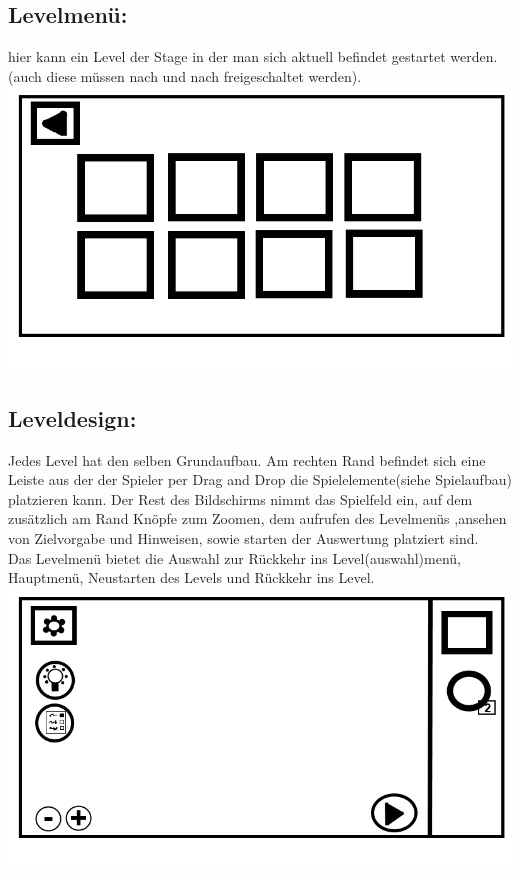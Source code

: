 \documentclass{scrartcl}
\begin{document}
\begin{enumerate}
	\begin{minipage}{1\textwidth}
		\item \subsection*{Levelmenü:}
		hier kann ein Level der Stage in der man sich aktuell befindet gestartet werden.(auch diese müssen nach und nach freigeschaltet werden).\\
		\includegraphics[width=\textwidth, height=7.5cm]{assets/Levelmenu}
	\end{minipage}
	
	\begin{minipage}{1\textwidth}
		\item \subsection*{Leveldesign:}
		Jedes Level hat den selben Grundaufbau. Am rechten Rand befindet sich eine Leiste aus der der Spieler per Drag and Drop die Spielelemente(siehe Spielaufbau) platzieren kann. Der Rest des Bildschirms nimmt das Spielfeld ein, auf dem zusätzlich am Rand Knöpfe zum Zoomen, dem aufrufen des Levelmenüs ,ansehen von Zielvorgabe und Hinweisen, sowie starten der Auswertung platziert sind.\\
		Das Levelmenü bietet die Auswahl zur Rückkehr ins Level(auswahl)menü, Hauptmenü, Neustarten des Levels und Rückkehr ins Level.\\
		\includegraphics[width=\textwidth, height=7.5cm]{assets/LevelDesign}
	\end{minipage}
	

\end{enumerate}
\end{document}
